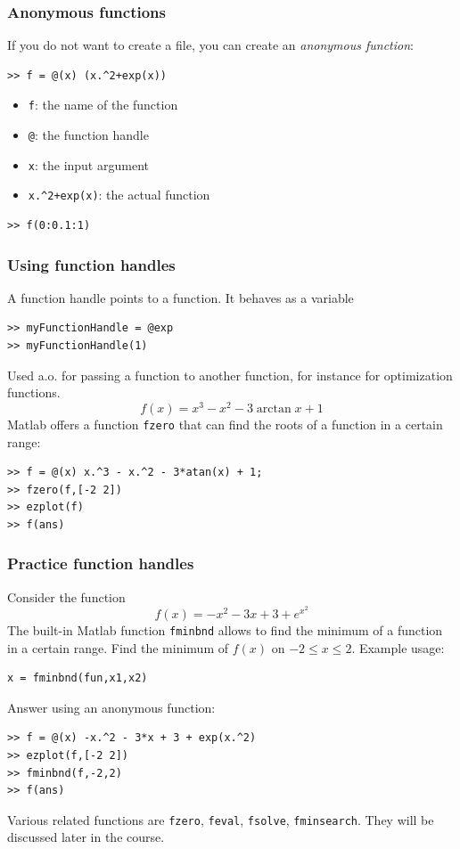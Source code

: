 \begin{frame}[fragile]
  \frametitle{Anonymous functions}
  If you do not want to create a file, you can create an \emph{anonymous function}:
  \begin{lstlisting}
>> f = @(x) (x.^2+exp(x))
  \end{lstlisting}
  \pause
  \begin{itemize}
    \item \lstinline$f$: the name of the function
    \item \lstinline$@$: the function handle
    \item \lstinline$x$: the input argument
    \item \lstinline$x.^2+exp(x)$: the actual function
  \end{itemize}\pause
  \begin{lstlisting}
>> f(0:0.1:1)   
  \end{lstlisting}
\end{frame}

\begin{frame}[fragile]
  \frametitle{Using function handles}
  A function handle points to a function. It behaves as a variable
  \begin{lstlisting}
>> myFunctionHandle = @exp 
>> myFunctionHandle(1)
  \end{lstlisting}
  \pause
  Used a.o. for passing a function to another function, for instance for optimization functions.
  \[ f(x) = x^3 -x^2 -3\arctan{x}+1 \]
  \pause
  Matlab offers a function \lstinline$fzero$ that can find the roots of a function in a certain range:
  \begin{lstlisting}
>> f = @(x) x.^3 - x.^2 - 3*atan(x) + 1;
>> fzero(f,[-2 2])
>> ezplot(f)
>> f(ans)
  \end{lstlisting}
\end{frame}

\begin{frame}[fragile]
  \frametitle{Practice function handles}
  Consider the function
  \[ f(x) = -x^2 - 3x + 3 + e^{x^2} \]
  The built-in Matlab function \lstinline$fminbnd$ allows to find the minimum of a function in a certain range. Find the minimum of $f(x)$ on $-2\leq x \leq2$.
  Example usage:
  \begin{lstlisting}
x = fminbnd(fun,x1,x2)
  \end{lstlisting}
  \pause
  Answer using an anonymous function:
  \begin{lstlisting}
>> f = @(x) -x.^2 - 3*x + 3 + exp(x.^2)
>> ezplot(f,[-2 2])
>> fminbnd(f,-2,2)
>> f(ans)
  \end{lstlisting}
  \pause
  Various related functions are \lstinline$fzero$, \lstinline$feval$, \lstinline$fsolve$, \lstinline$fminsearch$. They will be discussed later in the course.
\end{frame}

